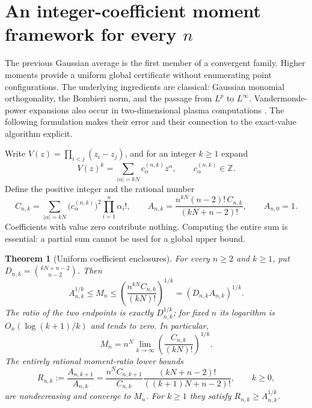 \documentclass[11pt]{article}
\newtheorem{theorem}{Theorem}[section]
\theoremstyle{remark}
\numberwithin{equation}{section}
\begin{document}
\section{An integer-coefficient moment framework for every \texorpdfstring{$n$}{n}}
\label{sec:moment-framework}
The previous Gaussian average is the first member of a convergent
family. Higher moments provide a uniform global certificate without
enumerating point configurations. The underlying ingredients are
classical: Gaussian monomial orthogonality, the Bombieri norm, and
the passage from $L^p$ to $L^\infty$. Vandermonde-power expansions
also occur in two-dimensional plasma computations
\cite{TF,Beauzamy}. The following formulation makes their error
and their connection to the exact-value algorithm explicit.

Write $V(z)=\prod_{i<j}(z_i-z_j)$, and for an integer $k\ge1$ expand
\[
 V(z)^k=\sum_{|\alpha|=kN}c_{\alpha}^{(n,k)}z^\alpha,
 \qquad c_{\alpha}^{(n,k)}\in\mathbb Z.
\]
Define the positive integer and the rational number
\begin{equation}\label{eq:coefficient-moment}
 C_{n,k}=\sum_{|\alpha|=kN}
       \bigl(c_{\alpha}^{(n,k)}\bigr)^2\prod_{i=1}^n\alpha_i!,
 \qquad
 A_{n,k}=\frac{n^{kN}(n-2)!\,C_{n,k}}{(kN+n-2)!},
 \qquad A_{n,0}=1.
\end{equation}
Coefficients with value zero contribute nothing. Computing the entire
sum is essential: a partial sum cannot be used for a global upper bound.

\begin{theorem}[Uniform coefficient enclosures]\label{thm:moment-framework}
For every $n\ge2$ and $k\ge1$, put
$D_{n,k}=\binom{kN+n-2}{n-2}$. Then
\begin{equation}\label{eq:moment-enclosure}
 A_{n,k}^{1/k}\le M_n\le
 \left(\frac{n^{kN}C_{n,k}}{(kN)!}\right)^{1/k}
 =(D_{n,k}A_{n,k})^{1/k}.
\end{equation}
The ratio of the two endpoints is exactly $D_{n,k}^{1/k}$;
for fixed $n$ its logarithm is
$O_n(\log(k+1)/k)$ and tends to zero. In particular,
\begin{equation}\label{eq:moment-exact-limit}
 \boxed{\displaystyle
 M_n=n^N\lim_{k\to\infty}
          \left(\frac{C_{n,k}}{(kN)!}\right)^{1/k}.}
\end{equation}
The entirely rational moment-ratio lower bounds
\begin{equation}\label{eq:moment-ratio}
 R_{n,k}:=\frac{A_{n,k+1}}{A_{n,k}}
 =\frac{n^NC_{n,k+1}}{C_{n,k}}
       \frac{(kN+n-2)!}{((k+1)N+n-2)!},\qquad k\ge0,
\end{equation}
are nondecreasing and converge to $M_n$. For $k\ge1$ they satisfy
$R_{n,k}\ge A_{n,k}^{1/k}$.
\end{theorem}
\end{document}
